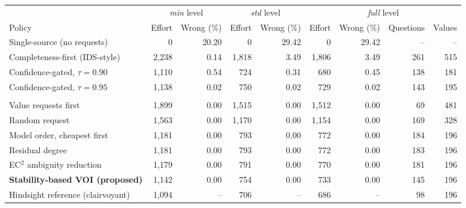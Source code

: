 \begin{tabular}{@{}lrrrrrrrr@{}}
\toprule
 & \multicolumn{2}{c}{\emph{min} level} & \multicolumn{2}{c}{\emph{std} level} & \multicolumn{4}{c}{\emph{full} level} \\
\cmidrule(lr){2-3}\cmidrule(lr){4-5}\cmidrule(l){6-9}
Policy & Effort & Wrong (\%) & Effort & Wrong (\%) & Effort & Wrong (\%) & Questions & Values \\
\midrule
Single-source (no requests) & 0 & 20.20 & 0 & 29.42 & 0 & 29.42 & -- & -- \\
Completeness-first (IDS-style) & 2,238 & 0.14 & 1,818 & 3.49 & 1,806 & 3.49 & 261 & 515 \\
\addlinespace
Confidence-gated, $\tau=0.90$ & 1,110 & 0.54 & 724 & 0.31 & 680 & 0.45 & 138 & 181 \\
Confidence-gated, $\tau=0.95$ & 1,138 & 0.02 & 750 & 0.02 & 729 & 0.02 & 143 & 195 \\
\addlinespace
\multicolumn{9}{@{}l}{\emph{Stability-gated policies}} \\
\quad Value requests first & 1,899 & 0.00 & 1,515 & 0.00 & 1,512 & 0.00 & 69 & 481 \\
\quad Random request & 1,563 & 0.00 & 1,170 & 0.00 & 1,154 & 0.00 & 169 & 328 \\
\quad Model order, cheapest first & 1,181 & 0.00 & 793 & 0.00 & 772 & 0.00 & 184 & 196 \\
\quad Residual degree & 1,181 & 0.00 & 793 & 0.00 & 772 & 0.00 & 183 & 196 \\
\quad EC$^2$ ambiguity reduction & 1,179 & 0.00 & 791 & 0.00 & 770 & 0.00 & 181 & 196 \\
\quad \textbf{Stability-based VOI (proposed)} & 1,142 & 0.00 & 754 & 0.00 & 733 & 0.00 & 145 & 196 \\
\addlinespace
Hindsight reference (clairvoyant) & 1,094 & -- & 706 & -- & 686 & -- & 98 & 196 \\
\bottomrule
\end{tabular}
